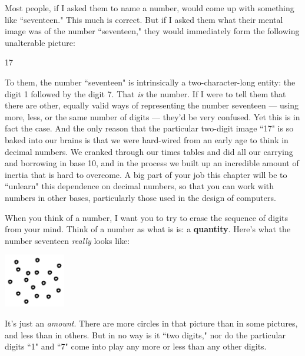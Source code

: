 Most people, if I asked them to name a number, would come up with something
like ``seventeen." This much is correct. But if I asked them what their
mental image was of the number ``seventeen," they would immediately form
the following unalterable picture:
\begin{center}
{\LARGE 
17
}
\end{center}
To them, the number ``seventeen" is intrinsically a two-character-long
entity: the digit 1 followed by the digit 7. That \textit{is} the number.
If I were to tell them that there are other, equally valid ways of
representing the number seventeen --- using more, less, or the same number
of digits --- they'd be very confused. Yet this is in fact the case. And
the only reason that the particular two-digit image ``17" is so baked into
our brains is that we were hard-wired from an early age to think in
decimal numbers. We cranked through our times tables and did all our
carrying and borrowing in base 10, and in the process we built up an
incredible amount of inertia that is hard to overcome. A big part of your
job this chapter will be to ``unlearn" this dependence on decimal numbers,
so that you can work with numbers in other bases, particularly those used
in the design of computers.

When you think of a number, I want you to try to erase the sequence of
digits from your mind. Think of a number as what is is: a
\textbf{quantity}. Here's what the number seventeen \textit{really} looks
like:
\begin{center}
\includegraphics[width=0.2\textwidth]{seventeen.png}
\end{center}
It's just an \textit{amount}. There are more circles in that picture than
in some pictures, and less than in others. But in no way is it ``two
digits," nor do the particular digits ``1" and ``7" come into play any more
or less than any other digits. 


